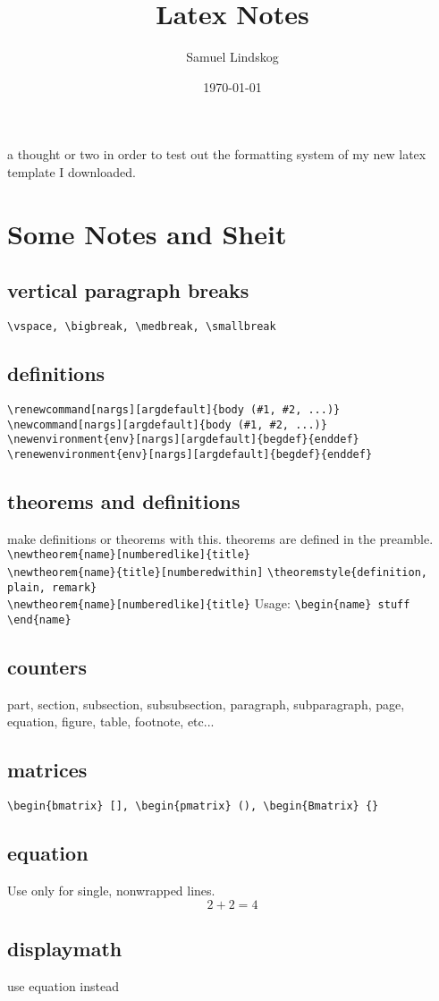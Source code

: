 \documentclass[nobib]{tufte-handout}
\begin{document}
\title{Latex Notes}
\author{Samuel Lindskog}
\date{\today}
\maketitle
{} a thought or two in order to test out the formatting system of my new latex template I downloaded.
\section{Some Notes and Sheit}
\subsection{vertical paragraph breaks}
\verb|\vspace, \bigbreak, \medbreak, \smallbreak|
\subsection{definitions}
\verb|\renewcommand[nargs][argdefault]{body (#1, #2, ...)}|\\
\verb|\newcommand[nargs][argdefault]{body (#1, #2, ...)}|\\
\verb|\newenvironment{env}[nargs][argdefault]{begdef}{enddef}|\\
\verb|\renewenvironment{env}[nargs][argdefault]{begdef}{enddef}|
\subsection{theorems and definitions}
make definitions or theorems with this. theorems are defined in the preamble.\medbreak
\verb|\newtheorem{name}[numberedlike]{title}|\\
\verb|\newtheorem{name}{title}[numberedwithin]|\medbreak
\verb|\theoremstyle{definition, plain, remark}|\\
\indent\verb|\newtheorem{name}[numberedlike]{title}|
Usage:\medbreak
\verb|\begin{name} stuff \end{name}|
\subsection{counters}
part, section, subsection, subsubsection, paragraph, subparagraph, page, equation, figure, table, footnote, etc...
\subsection{matrices}
\verb|\begin{bmatrix} [], \begin{pmatrix} (), \begin{Bmatrix} {}|
\subsection{}
\subsection{equation}
Use only for single, nonwrapped lines.
\begin{equation}
	2+2=4
\end{equation}
\subsection{displaymath}
use equation instead
\end{document}

